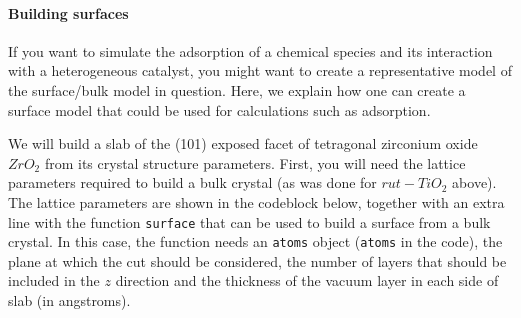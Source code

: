 \documentclass[11pt]{article}
\begin{document}
    \paragraph{Building surfaces}\label{building-surfaces}

If you want to simulate the adsorption of a chemical species and its
interaction with a heterogeneous catalyst, you might want to create a
representative model of the surface/bulk model in question. Here, we
explain how one can create a surface model that could be used for
calculations such as adsorption.

We will build a slab of the (101) exposed facet of tetragonal zirconium
oxide \(ZrO_2\) from its crystal structure parameters. First, you will
need the lattice parameters required to build a bulk crystal (as was
done for \(rut-TiO_2\) above). The lattice parameters are shown in the
codeblock below, together with an extra line with the function
\texttt{surface} that can be used to build a surface from a bulk
crystal. In this case, the function needs an \texttt{atoms} object
(\texttt{atoms} in the code), the plane at which the cut should be
considered, the number of layers that should be included in the \(z\)
direction and the thickness of the vacuum layer in each side of slab (in
angstroms).
\end{document}
